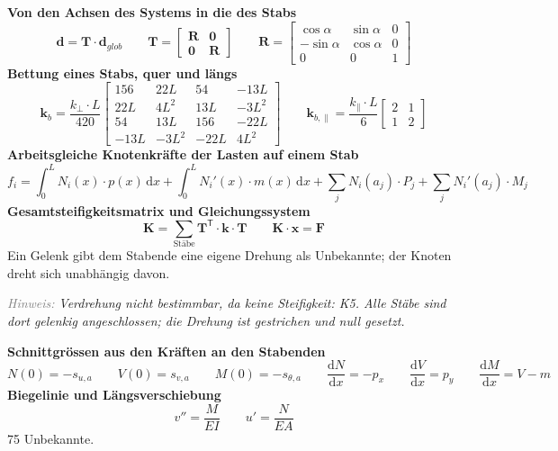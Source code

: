 \documentclass[11pt,a4paper]{article}
\newcommand{\hinweis}[2]{\par\noindent\textcolor{gray}{\textit{#1:}} \textit{#2}\par}
\begin{document}
\noindent\textbf{Von den Achsen des Systems in die des Stabs}
\begin{equation*}
\mathbf{d} = \mathbf{T} \cdot \mathbf{d}_{glob} \qquad \mathbf{T} = \begin{bmatrix} \mathbf{R} & \mathbf{0} \\ \mathbf{0} & \mathbf{R} \end{bmatrix} \qquad \mathbf{R} = \begin{bmatrix} \cos\alpha & \sin\alpha & 0 \\ -\sin\alpha & \cos\alpha & 0 \\ 0 & 0 & 1 \end{bmatrix}
\end{equation*}
\noindent\textbf{Bettung eines Stabs, quer und längs}
\begin{equation*}
\mathbf{k}_{b} = \frac{k_{\perp} \cdot L}{420} \begin{bmatrix} 156 & 22L & 54 & -13L \\ 22L & 4L^2 & 13L & -3L^2 \\ 54 & 13L & 156 & -22L \\ -13L & -3L^2 & -22L & 4L^2 \end{bmatrix} \qquad \mathbf{k}_{b,\parallel} = \frac{k_{\parallel} \cdot L}{6} \begin{bmatrix} 2 & 1 \\ 1 & 2 \end{bmatrix}
\end{equation*}
\noindent\textbf{Arbeitsgleiche Knotenkräfte der Lasten auf einem Stab}
\begin{equation*}
f_i = \int_0^L N_i(x) \cdot p(x)\,\mathrm{d}x + \int_0^L N_i'(x) \cdot m(x)\,\mathrm{d}x + \sum_j N_i(a_j) \cdot P_j + \sum_j N_i'(a_j) \cdot M_j
\end{equation*}
\noindent\textbf{Gesamtsteifigkeitsmatrix und Gleichungssystem}
\begin{equation*}
\mathbf{K} = \sum_{\text{Stäbe}} \mathbf{T}^{\mathsf{T}} \cdot \mathbf{k} \cdot \mathbf{T} \qquad \mathbf{K} \cdot \mathbf{x} = \mathbf{F}
\end{equation*}
Ein Gelenk gibt dem Stabende eine eigene Drehung als Unbekannte; der Knoten dreht sich unabhängig davon.

\hinweis{Hinweis}{Verdrehung nicht bestimmbar, da keine Steifigkeit: K5. Alle Stäbe sind dort gelenkig angeschlossen; die Drehung ist gestrichen und null gesetzt.}
\noindent\textbf{Schnittgrössen aus den Kräften an den Stabenden}
\begin{equation*}
N(0) = -s_{u,a} \qquad V(0) = s_{v,a} \qquad M(0) = -s_{\theta,a} \qquad \frac{\mathrm{d}N}{\mathrm{d}x} = -p_x \qquad \frac{\mathrm{d}V}{\mathrm{d}x} = p_y \qquad \frac{\mathrm{d}M}{\mathrm{d}x} = V - m
\end{equation*}
\noindent\textbf{Biegelinie und Längsverschiebung}
\begin{equation*}
v'' = \frac{M}{EI} \qquad u' = \frac{N}{EA}
\end{equation*}
75 Unbekannte.
\end{document}
